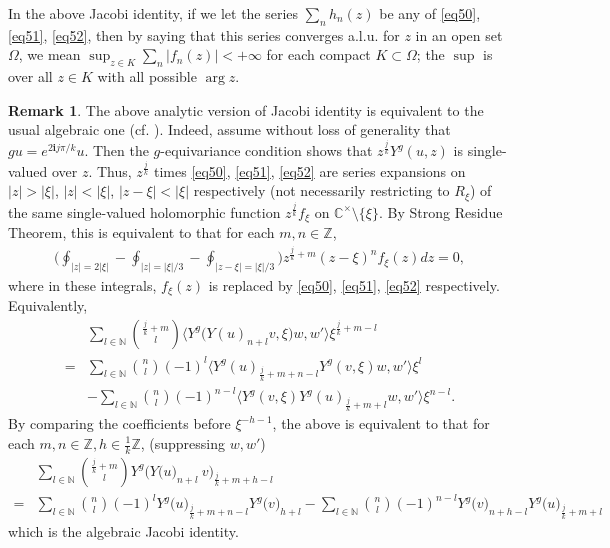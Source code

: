 \documentclass[12pt,a4paper,notitlepage]{article}
\theoremstyle{definition}
\newtheorem{rem}[df]{Remark}
\theoremstyle{plain}
\newcommand{\im}{\mathbf{i}}
\newcommand{\Cbb}{\mathbb C}
\newcommand{\Nbb}{\mathbb N}
\newcommand{\Zbb}{\mathbb Z}
\numberwithin{equation}{section}
\begin{document}
In the above Jacobi identity, if we let the series $\sum_n h_n(z)$ be any of \eqref{eq50}, \eqref{eq51}, \eqref{eq52}, then by saying that this series converges a.l.u. for $z$ in an open set $\Omega$, we mean $\sup_{z\in K}\sum_n|f_n(z)|<+\infty$ for each compact $K\subset\Omega$; the $\sup$ is over all $z\in K$ with all possible $\arg z$.


\begin{rem}
The above analytic version of Jacobi identity is equivalent to the usual algebraic one (cf. \cite[Thm. 2.4]{Hua10}). Indeed, assume without loss of generality that $gu=e^{2\im j\pi/k}u$. Then the $g$-equivariance condition shows that $z^{\frac jk}Y^g(u,z)$ is single-valued over $z$. Thus,  $z^{\frac jk}$ times \eqref{eq50}, \eqref{eq51}, \eqref{eq52} are series expansions on $|z|>|\xi|$, $|z|<|\xi|$, $|z-\xi|<|\xi|$ respectively (not necessarily restricting to $R_\xi$) of the same single-valued holomorphic function $z^{\frac jk}f_\xi$ on $\Cbb^\times\setminus\{\xi\}$. By Strong Residue Theorem, this is equivalent to that for each $m,n\in\Zbb$,
\begin{align*}
\Big(\oint_{|z|=2|\xi|}-\oint_{|z|=|\xi|/3}-\oint_{|z-\xi|=|\xi|/3}\Big)z^{\frac jk+m}(z-\xi)^nf_\xi(z)dz=0,
\end{align*}
where in these integrals, $f_\xi(z)$ is replaced by \eqref{eq50}, \eqref{eq51}, \eqref{eq52} respectively. Equivalently,
\begin{align}
&\sum_{l\in\Nbb}{\frac jk+m\choose l}\big\langle Y^g\big(Y(u)_{n+l}v,\xi\big)w,w'\big\rangle\xi^{\frac jk+m-l}\nonumber	\\
=&\sum_{l\in\Nbb}{n\choose l}(-1)^l\big\langle Y^g(u)_{\frac jk+m+n-l}Y^g(v,\xi)w,w'\big\rangle\xi^l \nonumber\\
&-\sum_{l\in\Nbb}{n\choose l}(-1)^{n-l}\big\langle Y^g(v,\xi)Y^g(u)_{\frac jk+m+l}w,w'\big\rangle\xi^{n-l}.
\end{align}
By comparing the coefficients before $\xi^{-h-1}$, the above is equivalent to that for each $m,n\in\Zbb,h\in\frac 1k\Zbb$, (suppressing $w,w'$)
\begin{align}
&\sum_{l\in\Nbb}{\frac jk+m\choose l} Y^g\big(Y\big(u\big)_{n+l}~v\big)_{\frac jk+m+h-l}  \nonumber\\
=&\sum_{l\in\Nbb}{n\choose l}(-1)^l Y^g\big(u\big)_{\frac jk+m+n-l}Y^g\big(v\big)_{h+l}-\sum_{l\in\Nbb}{n\choose l}(-1)^{n-l}Y^g\big(v\big)_{n+h-l}Y^g\big(u\big)_{\frac jk+m+l}	
\end{align}
which is the algebraic Jacobi identity.
\end{rem}
\end{document}
